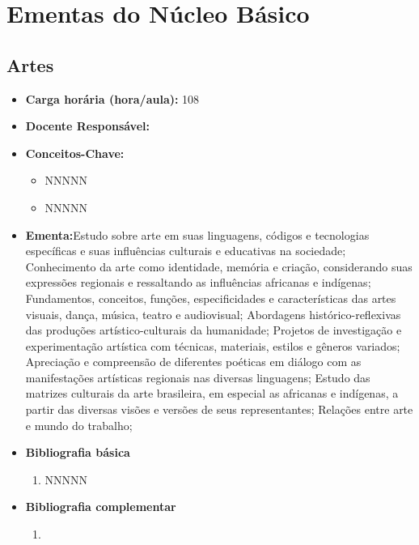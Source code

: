 \documentclass[11pt,fleqn]{book} %
\begin{document}
\section{Ementas do Núcleo Básico}\label{ementasBasico}

\newpage
\subsection{Artes}\label{disc:artes}
\begin{itemize}
	\item \textbf{Carga horária (hora/aula):} 108
	\item \textbf{Docente Responsável:}
	\item \textbf{Conceitos-Chave:}
	\begin{itemize}
		\item NNNNN
		\item NNNNN
	\end{itemize}
	\item \textbf{Ementa:}Estudo sobre arte em suas linguagens, códigos e tecnologias específicas e suas influências culturais e educativas na sociedade;
	Conhecimento da arte como identidade, memória e criação, considerando suas expressões regionais e ressaltando as influências africanas e indígenas;
	Fundamentos, conceitos, funções, especificidades e características das artes visuais, dança, música, teatro e audiovisual;
	Abordagens histórico-reflexivas das produções artístico-culturais da humanidade;
	Projetos de investigação e experimentação artística com técnicas, materiais, estilos e gêneros variados;
	Apreciação e compreensão de diferentes poéticas em diálogo com as manifestações artísticas regionais nas diversas linguagens;
	Estudo das matrizes culturais da arte brasileira, em especial as africanas e indígenas, a partir das diversas visões e versões de seus representantes;
	Relações entre arte e mundo do trabalho;
	\item \textbf{Bibliografia básica}
	\begin{enumerate}
		\item NNNNN
	\end{enumerate}
	\item \textbf{Bibliografia complementar}
	\begin{enumerate}
		\item 
	\end{enumerate}	
\end{itemize}

\newpage
\end{document}
